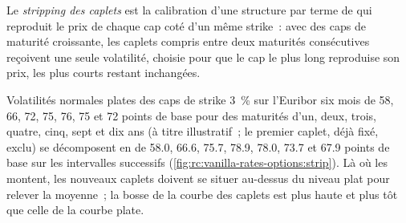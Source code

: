 \begin{definition}\label{def:rc:vanilla-rates-options:strip}
Le \emph{stripping des caplets} est la calibration
d'une structure par terme de  qui reproduit le prix de chaque cap coté d'un même strike~:
avec des caps de maturité croissante, les caplets compris entre deux maturités consécutives
reçoivent une seule volatilité, choisie pour que le cap le plus long reproduise son prix,
les  plus courts restant inchangées.
\end{definition}

\label{lst:rc:vanilla-rates-options:strip}

\begin{example}\label{ex:rc:vanilla-rates-options:strip}
Volatilités normales plates des caps de strike 3~\% sur l'Euribor six mois de 58, 66,
72, 75, 76, 75 et 72 points de base pour des maturités d'un, deux, trois, quatre, cinq, sept et
dix ans (à titre illustratif~; le premier caplet, déjà fixé, exclu) se décomposent en
 de 58.0, 66.6, 75.7, 78.9, 78.0, 73.7 et 67.9 points de base
sur les intervalles successifs (\cref{fig:rc:vanilla-rates-options:strip}). Là où
les  montent, les nouveaux caplets doivent se situer au-dessus du niveau
plat pour relever la moyenne~; la bosse de la courbe des caplets est plus haute et plus tôt que celle de la
courbe plate.
\end{example}

